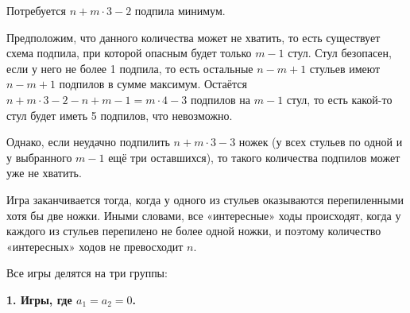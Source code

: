 \begin{itemize}
\itA {}

\itB 


Потребуется $n + m \cdot 3 - 2$ подпила минимум.

Предположим, что данного количества может не хватить, то есть существует
схема подпила, при которой опасным будет только $m-1$ стул. 
Стул безопасен, если у него не более 1 подпила, 
то есть остальные $n-m+1$ стульев имеют $n-m+1$ подпилов в сумме максимум.
Остаётся $n + m \cdot 3 - 2 - n + m -1 = m \cdot 4 - 3$ подпилов на $m-1$ стул,
то есть какой-то стул будет иметь 5 подпилов, что невозможно.

Однако, если неудачно подпилить $n + m \cdot 3 - 3$ ножек (у всех стульев по
одной и у выбранного $m-1$ ещё три оставшихся), то такого количества
подпилов может уже не хватить.

\iffalse {
	В кафе $n$ четырёхногих стульев. Стул падает, если у него меньше 
	трёх целых ножек. У мальчиков Васи и Пети есть две пилы, и они изобретают 
	себе игру. Мальчики уже сошлись на том, что первым ходит Петя, а проигрывает 
	тот, после чьего хода упадёт первый стул. Осталось выбрать возможное число 
	перепиливаний за ход для каждого из них. Пусть за каждый ход Петя 
	перепиливает не менее чем $a_1$ и не более чем $b_1$ ножек, Вася — от $a_2$ до 
	$b_2$ ножек. Числа $a_1$ и $a_2$ могут быть равны нулю или единице, а 
	числа $b_1$ и $b_2$ — $m$ или $m-1$, $m<n$, но при этом обязательно $b_1 \ne b_2$. 
	Сколько игр удовлетворяет этим условиям, и кто из мальчиков выиграет в каждой из них?
} \fi

\itC Игра заканчивается тогда, когда у одного из стульев оказываются перепиленными
хотя бы две ножки. Иными словами, все «интересные» ходы происходят, когда у каждого
из стульев перепилено не более одной ножки, и поэтому количество «интересных» ходов
не превосходит $n$.

Все игры делятся на три группы:

\begin{center} \bfseries
	1. Игры, где $a_1 = a_2 = 0$.
\end{center}


\end{itemize}

